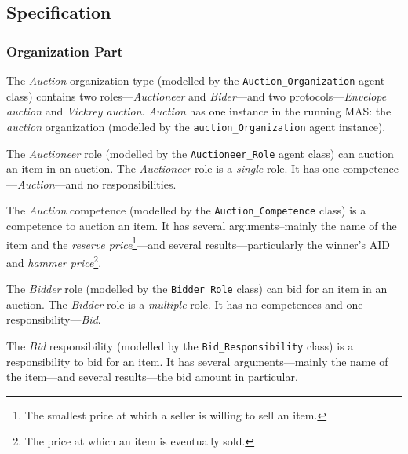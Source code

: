 \subsection*{Specification}

\subsubsection*{Organization Part}

The \textit{Auction} organization type (modelled by the \texttt{Auction\_Organization} agent class) contains two roles---\textit{Auctioneer} and \textit{Bider}---and two protocols---\textit{Envelope auction} and  \textit{Vickrey auction}.
\textit{Auction} has one instance in the running MAS: the \textit{auction} organization (modelled by the \texttt{auction\_Organization} agent instance).

The \textit{Auctioneer} role (modelled by the \texttt{Auctioneer\_Role} agent class) can auction an item in an auction.
The \textit{Auctioneer} role is a \textit{single} role.
It has one competence---\textit{Auction}---and no responsibilities.

The \textit{Auction} competence (modelled by the \texttt{Auction\_Competence} class) is a competence to auction an item.
It has several arguments--mainly the name of the item and the \textit{reserve price}\footnote{The smallest price at which a seller is willing to sell an item.}---and several results---particularly the winner's AID and \textit{hammer price}\footnote{The price at which an item is eventually sold.}.

The \textit{Bidder} role (modelled by the \texttt{Bidder\_Role} class) can bid for an item in an auction.
The \textit{Bidder} role is a \textit{multiple} role.
It has no competences and one responsibility---\textit{Bid}.

The \textit{Bid} responsibility (modelled by the \texttt{Bid\_Responsibility} class) is a responsibility to bid for an item.
It has several arguments---mainly the name of the item---and several results---the bid amount in particular.

